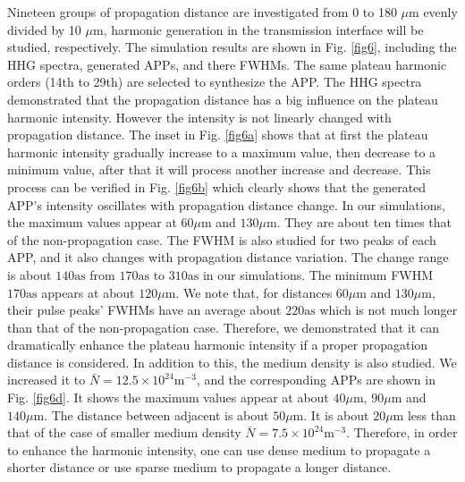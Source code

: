 \documentclass[10pt,letterpaper]{article}
\begin{document}
Nineteen groups of propagation distance are investigated from 0 to 180 $ \mu $m evenly divided by 10 $ \mu $m, harmonic generation in the transmission interface will be studied, respectively. The simulation results are shown in Fig. \ref{fig6}, including the HHG spectra, generated APPs, and there FWHMs. The same plateau harmonic orders (14th to 29th) are selected to synthesize the APP. The HHG spectra demonstrated that the propagation distance has a big influence on the plateau harmonic intensity. However the intensity is not linearly changed with propagation distance. The inset in Fig. \ref{fig6a} shows that at first the plateau harmonic intensity gradually increase to a maximum value, then decrease to a minimum value, after that it will process another increase and decrease. This process can be verified in Fig. \ref{fig6b} which clearly shows that the generated APP's intensity oscillates with propagation distance change. In our simulations, the maximum values appear at $60\mu\textrm{m}$ and $130\mu\textrm{m}$. They are about ten times that of the non-propagation case. The FWHM is also studied for two peaks of each APP, and it also changes with propagation distance variation. The change range is about $140\textrm{as}$ from $170\textrm{as}$ to $310\textrm{as}$ in our simulations. The minimum FWHM $170\textrm{as}$ appears at about $120\mu\textrm{m}$. We note that, for distances $60\mu\textrm{m}$ and $130\mu\textrm{m}$, their pulse peaks’ FWHMs have an average about $220\textrm{as}$ which is not much longer than that of the non-propagation case. Therefore, we demonstrated that it can dramatically enhance the plateau harmonic intensity if a proper propagation distance is considered. In addition to this, the medium density is also studied. We increased it to $\bar{N}=12.5\times10^{24}\textrm{m}^{-3}$, and the corresponding APPs are shown in Fig. \ref{fig6d}. It shows the maximum values appear at about $40\mu\textrm{m}$, $90\mu\textrm{m}$ and $140\mu\textrm{m}$. The distance between adjacent is about $50\mu\textrm{m}$. It is about $20\mu\textrm{m}$ less than that of the case of smaller medium density $\bar{N}=7.5\times10^{24}\textrm{m}^{-3}$. Therefore, in order to enhance the harmonic intensity, one can use dense medium to propagate a shorter distance or use sparse medium to propagate a longer distance.
\end{document}
